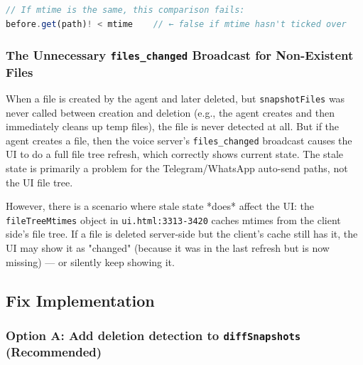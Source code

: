 \begin{lstlisting}[language=TypeScript]
// If mtime is the same, this comparison fails:
before.get(path)! < mtime    // ← false if mtime hasn't ticked over

\end{lstlisting}



\subsubsection*{The Unnecessary \texttt{files\_changed} Broadcast for Non-Existent Files}

When a file is created by the agent and later deleted, but \texttt{snapshotFiles} was never called between creation and deletion (e.g., the agent creates and then immediately cleans up temp files), the file is never detected at all. But if the agent creates a file, then the voice server's \texttt{files\_changed} broadcast causes the UI to do a full file tree refresh, which correctly shows current state. The stale state is primarily a problem for the Telegram/WhatsApp auto-send paths, not the UI file tree.

However, there is a scenario where stale state *does* affect the UI: the \texttt{fileTreeMtimes} object in \texttt{ui.html:3313-3420} caches mtimes from the client side's file tree. If a file is deleted server-side but the client's cache still has it, the UI may show it as "changed" (because it was in the last refresh but is now missing) — or silently keep showing it.


\subsection*{Fix Implementation}
\subsubsection*{Option A: Add deletion detection to \texttt{diffSnapshots} (Recommended)}



